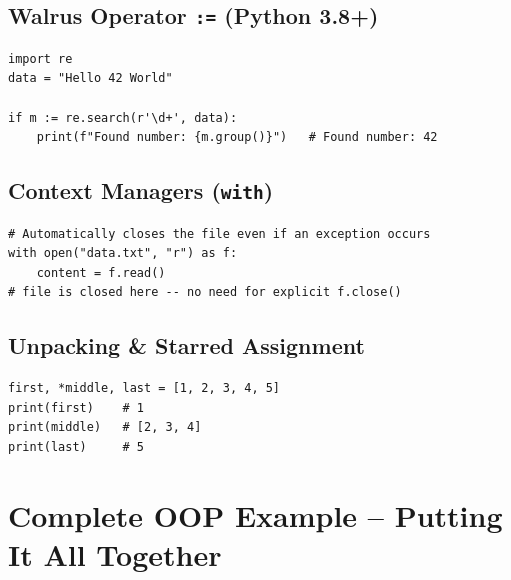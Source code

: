 \documentclass[12pt,a4paper]{article}
\begin{document}
\subsection{Walrus Operator \texttt{:=} (Python 3.8+)}

\begin{lstlisting}
import re
data = "Hello 42 World"

if m := re.search(r'\d+', data):
    print(f"Found number: {m.group()}")   # Found number: 42
\end{lstlisting}

\subsection{Context Managers (\texttt{with})}

\begin{lstlisting}
# Automatically closes the file even if an exception occurs
with open("data.txt", "r") as f:
    content = f.read()
# file is closed here -- no need for explicit f.close()
\end{lstlisting}

\subsection{Unpacking \& Starred Assignment}

\begin{lstlisting}
first, *middle, last = [1, 2, 3, 4, 5]
print(first)    # 1
print(middle)   # [2, 3, 4]
print(last)     # 5
\end{lstlisting}

\section{Complete OOP Example -- Putting It All Together}
\end{document}
